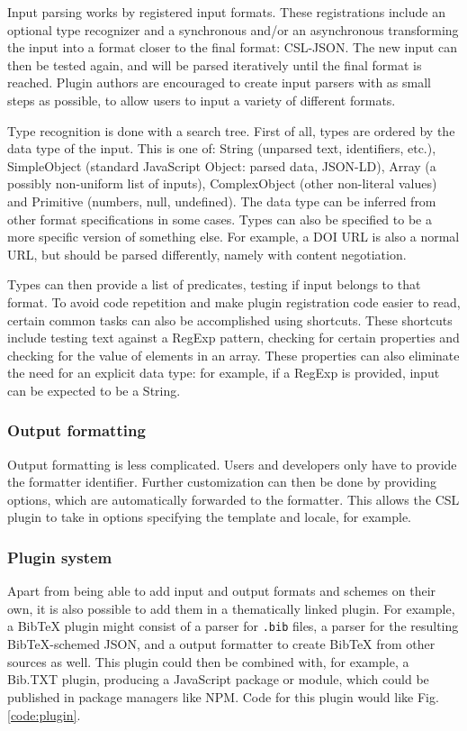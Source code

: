 \documentclass[fleqn,10pt,lineno]{wlpeerj} %
\begin{document}
Input parsing works by registered input formats. These registrations include an optional type recognizer and a synchronous and/or an asynchronous transforming the input into a format closer to the final format: CSL-JSON. The new input can then be tested again, and will be parsed iteratively until the final format is reached. Plugin authors are encouraged to create input parsers with as small steps as possible, to allow users to input a variety of different formats.

Type recognition is done with a search tree. First of all, types are ordered by the data type of the input. This is one of: String (unparsed text, identifiers, etc.), SimpleObject (standard JavaScript Object: parsed data, JSON-LD), Array (a possibly non-uniform list of inputs), ComplexObject (other non-literal values) and Primitive (numbers, null, undefined). The data type can be inferred from other format specifications in some cases. Types can also be specified to be a more specific version of something else. For example, a DOI URL is also a normal URL, but should be parsed differently, namely with content negotiation.

Types can then provide a list of predicates, testing if input belongs to that format. To avoid code repetition and make plugin registration code easier to read, certain common tasks can also be accomplished using shortcuts. These shortcuts include testing text against a RegExp pattern, checking for certain properties and checking for the value of elements in an array. These properties can also eliminate the need for an explicit data type: for example, if a RegExp is provided, input can be expected to be a String.

\subsubsection*{Output formatting}

Output formatting is less complicated. Users and developers only have to provide the formatter identifier. Further customization can then be done by providing options, which are automatically forwarded to the formatter. This allows the CSL plugin to take in options specifying the template and locale, for example.

\subsubsection*{Plugin system}

Apart from being able to add input and output formats and schemes on their own, it is also possible to add them in a thematically linked plugin. For example, a BibTeX plugin might consist of a parser for \texttt{.bib} files, a parser for the resulting BibTeX-schemed JSON, and a output formatter to create BibTeX from other sources as well. This plugin could then be combined with, for example, a Bib.TXT plugin, producing a JavaScript package or module, which could be published in package managers like NPM. Code for this plugin would like Fig. \ref{code:plugin}.
\end{document}
